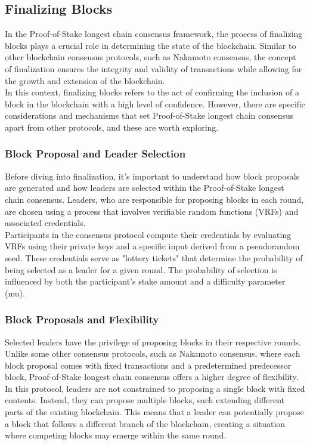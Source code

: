 \subsection{Finalizing Blocks}
In the Proof-of-Stake longest chain consensus framework, the process of finalizing blocks plays a crucial role in determining the state of the blockchain. Similar to other blockchain consensus protocols, such as Nakamoto consensus, the concept of finalization ensures the integrity and validity of transactions while allowing for the growth and extension of the blockchain.\\
In this context, finalizing blocks refers to the act of confirming the inclusion of a block in the blockchain with a high level of confidence. However, there are specific considerations and mechanisms that set Proof-of-Stake longest chain consensus apart from other protocols, and these are worth exploring.

\subsubsection{Block Proposal and Leader Selection}
Before diving into finalization, it's important to understand how block proposals are generated and how leaders are selected within the Proof-of-Stake longest chain consensus. Leaders, who are responsible for proposing blocks in each round, are chosen using a process that involves verifiable random functions (VRFs) and associated credentials.\\
Participants in the consensus protocol compute their credentials by evaluating VRFs using their private keys and a specific input derived from a pseudorandom seed. These credentials serve as "lottery tickets" that determine the probability of being selected as a leader for a given round. The probability of selection is influenced by both the participant's stake amount and a difficulty parameter (mu).

\subsubsection{Block Proposals and Flexibility}
Selected leaders have the privilege of proposing blocks in their respective rounds. Unlike some other consensus protocols, such as Nakamoto consensus, where each block proposal comes with fixed transactions and a predetermined predecessor block, Proof-of-Stake longest chain consensus offers a higher degree of flexibility.\\
In this protocol, leaders are not constrained to proposing a single block with fixed contents. Instead, they can propose multiple blocks, each extending different parts of the existing blockchain. This means that a leader can potentially propose a block that follows a different branch of the blockchain, creating a situation where competing blocks may emerge within the same round.

